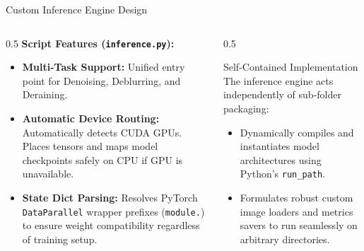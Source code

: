 \documentclass[aspectratio=169]{beamer}
\begin{document}
\begin{frame}{Custom Inference Engine Design}
    \begin{columns}
        \begin{column}{0.5\textwidth}
            \textbf{Script Features (\texttt{inference.py}):}
            \begin{itemize}
                \item \textbf{Multi-Task Support:} Unified entry point for Denoising, Deblurring, and Deraining.
                \item \textbf{Automatic Device Routing:} Automatically detects CUDA GPUs. Places tensors and maps model checkpoints safely on CPU if GPU is unavailable.
                \item \textbf{State Dict Parsing:} Resolves PyTorch \texttt{DataParallel} wrapper prefixes (\texttt{module.}) to ensure weight compatibility regardless of training setup.
            \end{itemize}
        \end{column}
        \begin{column}{0.5\textwidth}
            \begin{block}{Self-Contained Implementation}
                \small
                The inference engine acts independently of sub-folder packaging:
                \begin{itemize}
                    \item Dynamically compiles and instantiates model architectures using Python's \texttt{run\_path}.
                    \item Formulates robust custom image loaders and metrics savers to run seamlessly on arbitrary directories.
                \end{itemize}
            \end{block}
        \end{column}
    \end{columns}
\end{frame}
\end{document}
